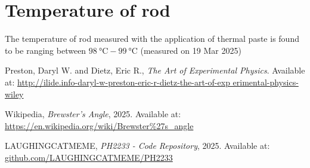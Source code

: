 \documentclass[%
 jor,
 amsmath,amssymb,
 reprint,
]{revtex4-2}
\begin{document}
\appendix
\section{Temperature of rod}\label{rodtemp}
The temperature of rod measured with the application of thermal paste is found to be ranging between $98~\si{\celsius}-99~\si{\celsius}$ (measured on 19 Mar 2025)






\begin{thebibliography}{9}
Preston, Daryl W. and Dietz, Eric R., \emph{The Art of Experimental Physics}. Available at: \url{http://ilide.info-daryl-w-preston-eric-r-dietz-the-art-of-exp    erimental-physics-wiley}

Wikipedia, \emph{Brewster's Angle}, 2025. Available at: \url{https://en.wikipedia.org/wiki/Brewster%27s_angle}

LAUGHINGCATMEME, \emph{PH2233 - Code Repository}, 2025. Available at: \url{github.com/LAUGHINGCATMEME/PH2233}
\end{thebibliography}
\end{document}

